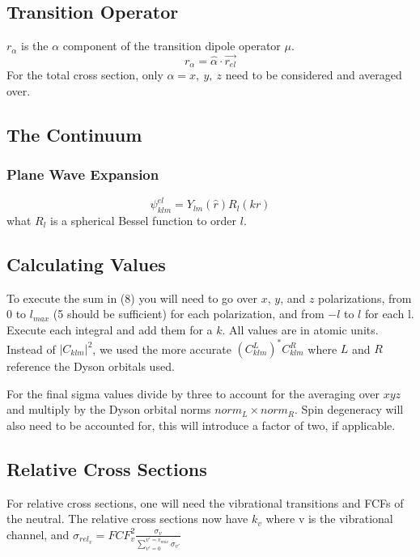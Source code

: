 \documentclass{article}
\begin{document}
\subsection{Transition Operator}
$r_\alpha$ is the $\alpha$ component of the transition dipole operator \textbf{$\mu$}.
\begin{equation}
    r_\alpha = \hat{\alpha} \cdot \vec{r_{el}}
\end{equation}
For the total cross section, only $\alpha = x,\ y, \ z$ need to be considered and averaged over.
\subsection{The Continuum}
\subsubsection{Plane Wave Expansion}
\begin{equation}
    \psi^{el}_{klm} = Y_{lm}({\hat{r}}) R_l(kr)
\end{equation}
what $R_l$ is a spherical Bessel function to order $l$.
\subsection{Calculating Values}
To execute the sum in (8) you will need to go over $x$, $y$, and $z$ polarizations, from 0 to $l_{max}$ (5 should be sufficient) for each polarization, and from $-l$ to $l$ for each l. Execute each integral and add them for a $k$. All values are in atomic units. Instead of $|C_{klm}|^2$, we used the more accurate $(C^{L}_{klm})^*C^{R}_{klm}$ where $L$ and $R$ reference the Dyson orbitals used.

For the final sigma values divide by three to account for the averaging over $xyz$ and multiply by the Dyson orbital norms $norm_L \times norm_R$. Spin degeneracy will also need to be accounted for, this will introduce a factor of two, if applicable.
\subsection{Relative Cross Sections}
For relative cross sections, one will need the vibrational transitions and FCFs of the neutral. The relative cross sections now have $k_v$ where v is the vibrational channel, and $\sigma_{{rel}_v} = FCF_v^2\frac{\sigma_v}{\sum_{v'=0}^{v'=v_{max}}\sigma_{v'}}$


\end{document}
